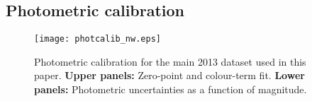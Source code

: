 \documentclass[a4paper,fleqn,usenatbib]{mnras}
\begin{document}
\subsection{Photometric calibration}
\label{phot}

\begin{figure}
\centering
\texttt{[image: photcalib\_nw.eps]}
\caption{Photometric calibration for the main 2013 dataset used in this paper. 
{\bf Upper panels:} Zero-point and colour-term fit. 
{\bf Lower panels:} %
Photometric uncertainties as a function of magnitude.  
}
\label{fig_photcal}
\end{figure}
\end{document}
